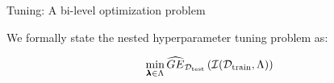 \begin{frame}{Tuning: A bi-level optimization problem}













\framebreak

We formally state the nested hyperparameter tuning problem as:

$$
\min_{\pmb{\lambda} \in \Lambda} \widehat{GE}_{\mathcal{D}_{\text{test}}}\left(\mathcal{I}(\mathcal{D}_{\text{train}}, \Lambda)\right)
$$


\end{frame}
